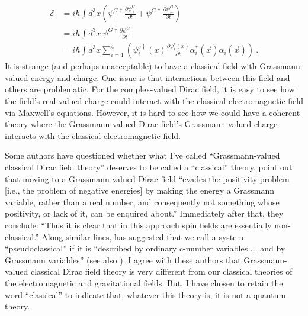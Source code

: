 \documentclass[onecolumn,secnumarabic,amsmath,amssymb,balancelastpage,nofootinbib]{article}
\begin{document}
\begin{align}
\mathcal{E}&=i \hbar \int{d^3 x \left( \psi_+^{G\dagger}\frac{\partial \psi^G_+}{\partial t} + \psi_-^{G\dagger}\frac{\partial \psi^G_-}{\partial t}\right)}
\nonumber
\\
&=i \hbar \int{d^3 x \ \psi^{G\dagger}\frac{\partial \psi^G}{\partial t}}
\nonumber
\\
&=i \hbar \int{d^3 x \sum_{i=1}^{4} \left( \psi_i^{c \dagger} (x) \frac{\partial \psi_i^c(x)}{\partial t} \alpha^{*}_i(\vec{x})\alpha_i(\vec{x}) \right)}
\ .
\label{classicalenergyGrassmann}
\end{align}
It is strange (and perhaps unacceptable) to have a classical field with Grassmann-valued energy and charge.  One issue is that interactions between this field and others are problematic.  For the complex-valued Dirac field, it is easy to see how the field's real-valued charge could interact with the classical electromagnetic field via Maxwell's equations.  However, it is hard to see how we could have a coherent theory where the Grassmann-valued Dirac field's Grassmann-valued charge interacts with the classical electromagnetic field.

Some authors have questioned whether what I've called ``Grassmann-valued classical Dirac field theory'' deserves to be called a ``classical'' theory.  \citet[pg.\ 28]{bailinlove} point out that moving to a Grassmann-valued Dirac field ``evades the positivity problem [i.e., the problem of negative energies] by making the energy a Grassmann variable, rather than a real number, and consequently not something whose positivity, or lack of it, can be enquired about.''  Immediately after that, they conclude: ``Thus it is clear that in this approach spin fields are essentially non-classical.''  Along similar lines, \citet{casalbuoni1976} has suggested that we call a system ``pseudoclassical'' if it is ``described by ordinary c-number variables ... and by Grassmann variables'' (see also \citealp[ch.\ 11]{freund1986}).  I agree with these authors that Grassmann-valued classical Dirac field theory is very different from our classical theories of the electromagnetic and gravitational fields.  But, I have chosen to retain the word ``classical'' to indicate that, whatever this theory is, it is not a quantum theory.
\end{document}
